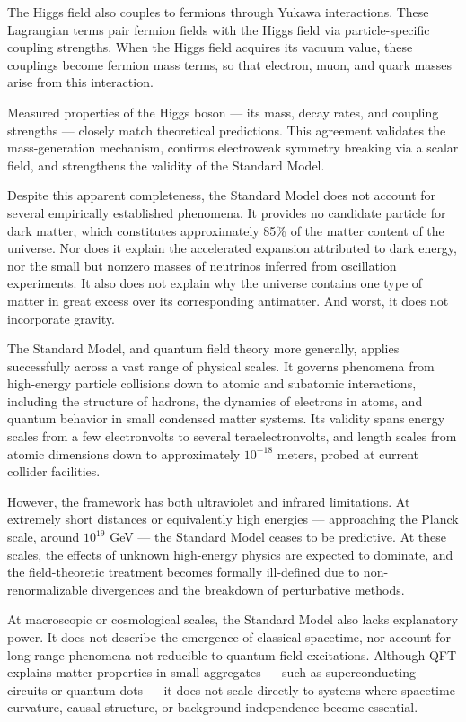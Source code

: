 The Higgs field also couples to fermions through Yukawa interactions. These Lagrangian terms pair fermion fields with the Higgs field via particle-specific coupling strengths. When the Higgs field acquires its vacuum value, these couplings become fermion mass terms, so that electron, muon, and quark masses arise from this interaction.

Measured properties of the Higgs boson — its mass, decay rates, and coupling strengths — closely match theoretical predictions. This agreement validates the mass-generation mechanism, confirms electroweak symmetry breaking via a scalar field, and strengthens the validity of the Standard Model.

Despite this apparent completeness, the Standard Model does not account for several empirically established phenomena. It provides no candidate particle for dark matter, which constitutes approximately 85\% of the matter content of the universe. Nor does it explain the accelerated expansion attributed to dark energy, nor the small but nonzero masses of neutrinos inferred from oscillation experiments. It also does not explain why the universe contains one type of matter in great excess over its corresponding antimatter. And worst, it does not incorporate gravity.

The Standard Model, and quantum field theory more generally, applies successfully across a vast range of physical scales. It governs phenomena from high-energy particle collisions down to atomic and subatomic interactions, including the structure of hadrons, the dynamics of electrons in atoms, and quantum behavior in small condensed matter systems. Its validity spans energy scales from a few electronvolts to several teraelectronvolts, and length scales from atomic dimensions down to approximately $10^{-18}$ meters, probed at current collider facilities.

However, the framework has both ultraviolet and infrared limitations. At extremely short distances or equivalently high energies — approaching the Planck scale, around $10^{19}$ GeV — the Standard Model ceases to be predictive. At these scales, the effects of unknown high-energy physics are expected to dominate, and the field-theoretic treatment becomes formally ill-defined due to non-renormalizable divergences and the breakdown of perturbative methods. 

At macroscopic or cosmological scales, the Standard Model also lacks explanatory power. It does not describe the emergence of classical spacetime, nor account for long-range phenomena not reducible to quantum field excitations. Although QFT explains matter properties in small aggregates — such as superconducting circuits or quantum dots — it does not scale directly to systems where spacetime curvature, causal structure, or background independence become essential.


